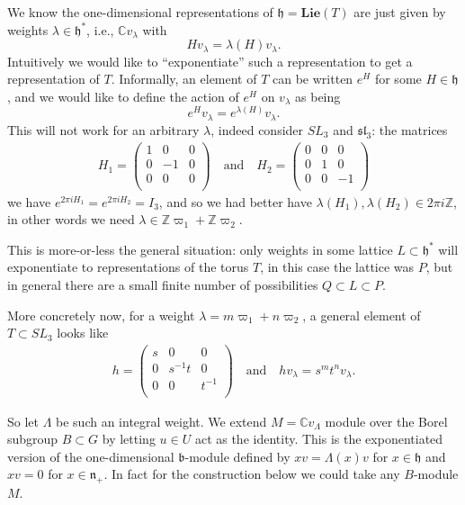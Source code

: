 \documentclass[12pt]{article}
\theoremstyle{plain}
\theoremstyle{definition}
\numberwithin{equation}{section}
\newcommand{\la}{\lambda}
\newcommand{\La}{\Lambda}
\newcommand{\C}{\mathbb{C}}
\newcommand{\Z}{\mathbb{Z}}
\newcommand{\frakb}{\mathfrak{b}}
\newcommand{\h}{\mathfrak{h}}
\newcommand{\n}{\mathfrak{n}}
\newcommand{\sll}{\mathfrak{sl}}
\newcommand{\Lie}{\mathbf{Lie}}
\begin{document}
We know the one-dimensional representations of $\h = \Lie(T)$ are just given by weights $\la \in \h^*$, i.e., $\C v_\la$ with
\[
H v_\la = \la(H) v_\la.
\]
Intuitively we would like to ``exponentiate'' such a representation to get a representation of $T$. Informally, an element of $T$ can be written $e^H$ for some $H \in \h$, and we would like to define the action of $e^H$ on $v_\la$ as being
\[
e^{H} v_\la = e^{\la(H)} v_\la.
\]
This will not work for an arbitrary $\la$, indeed consider $SL_3$ and $\sll_3$: the matrices
\begin{align*}
H_1 = \left(
\begin{array}{ccc}
1 & 0 & 0 \\
0 & -1 & 0 \\
0 & 0 & 0 \\
\end{array}
\right)
%
\quad \text{and} \quad
H_2 = \left(
\begin{array}{ccc}
0 & 0 & 0 \\
0 & 1 & 0 \\
0 & 0 & -1 \\
\end{array}
\right)
\end{align*}
we have $e^{2\pi i H_1} = e^{2\pi i H_2} = I_3$, and so we had better have $\la(H_1), \la(H_2) \in 2\pi i \Z$, in other words we need $\la \in \Z \varpi_1 + \Z \varpi_2$.

This is more-or-less the general situation: only weights in some lattice $L \subset \h^*$ will exponentiate to representations of the torus $T$, in this case the lattice was $P$, but in general there are a small finite number of possibilities $Q \subset L \subset P$.

More concretely now, for a weight $\la = m \varpi_1 + n \varpi_2$, a general element of $T \subset SL_3$ looks like
\begin{align*}
h = \left(
\begin{array}{ccc}
s & 0 & 0 \\
0 & s^{-1} t & 0 \\
0 & 0 & t^{-1} \\
\end{array}
\right)
%
\quad \text{and} \quad
h v_\la = s^m t^n v_\la.
\end{align*}

So let $\La$ be such an integral weight. We extend $M = \C v_\La$ module over the Borel subgroup $B \subset G$ by letting $u \in U$ act as the identity. This is the exponentiated version of the one-dimensional $\frakb$-module defined by $x v = \Lambda(x) v$ for $x \in \h$ and $xv = 0$ for $x \in \n_+$. In fact for the construction below we could take any $B$-module $M$.
\end{document}
